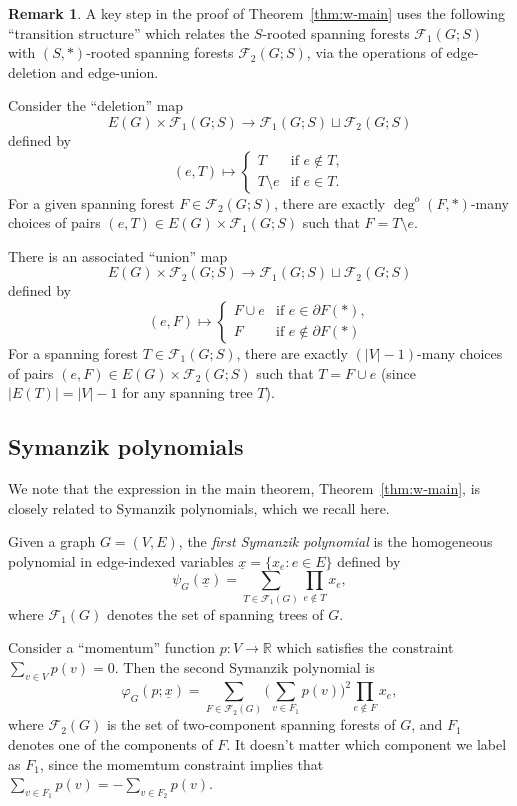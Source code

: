 \documentclass{amsart}
\theoremstyle{definition}
\newtheorem{rmk}[thm]{Remark}
\newcommand{\RR}{\mathbb{R}}
\newcommand{\trees}{\mathcal{F}_1}
\newcommand{\forests}{\mathcal{F}}
\newcommand{\degout}{\deg^o}
\begin{document}
\begin{rmk}
A key step in the proof of Theorem~\ref{thm:w-main} uses the following ``transition structure'' which relates the $S$-rooted spanning forests $\trees(G; S)$ with $(S,*)$-rooted spanning forests $\forests_2(G; S)$,
via the operations of edge-deletion and edge-union.

Consider the ``deletion'' map
\[
	E(G) \times \trees(G;S) \to \trees(G;S) \sqcup \forests_2(G;S)
\]
defined by
\[
	(e, T) \mapsto \begin{cases}
	T &\text{if } e\not\in T,\\
	T \setminus e &\text{if } e\in T.
	\end{cases}
\]
For a given spanning forest
$F \in \forests_2(G;S)$,
there are exactly $\degout(F, *)$-many choices of pairs $(e, T) \in E(G) \times \trees(G;S)$ such that
$F = T \setminus e$.

There is an associated ``union'' map 
\[
	E(G) \times \forests_2(G;S) \longrightarrow \trees(G;S) \sqcup \forests_2(G;S)
\]
defined by
\[
	(e, F) \mapsto \begin{cases}
		F \cup e &\text{if } e \in \partial F(*), \\
		F &\text{if } e \not\in \partial F(*)
	\end{cases}
\]
For a spanning forest $T \in \trees(G; S)$, 
there are exactly $(|V| - 1)$-many choices of pairs $(e, F) \in E(G) \times \forests_2(G; S)$ such that $T = F \cup e$
(since $|E(T)| = |V| - 1$ for any spanning tree $T$). 
\end{rmk}

\subsection{Symanzik polynomials}

We note that the expression in the main theorem, Theorem~\ref{thm:w-main}, is closely related to Symanzik polynomials, which we recall here.

Given a graph $G = (V, E)$, the {\em first Symanzik polynomial} is the homogeneous polynomial in edge-indexed variables $\underline{x} = \{x_e : e \in E\}$ defined by
\[
	\psi_G(\underline{x}) = \sum_{T \in \trees(G)} \prod_{e \not \in T} x_e ,
\]
where $\trees(G)$ denotes the set of spanning trees of $G$.

Consider a ``momentum'' function $p: V \to \RR$ which satisfies the constraint $\sum_{v \in V} p(v) = 0$.
Then the second Symanzik polynomial is
\[
	\varphi_G(p; \underline{x}) = \sum_{F \in \forests_2(G)} \Big(\sum_{v \in F_1} p(v) \Big)^2 \prod_{e \not\in F} x_e ,
\]
where $\forests_2(G)$ is the set of two-component spanning forests of $G$, and $F_1$ denotes one of the components of $F$.
It doesn't matter which component we label as $F_1$, since the momemtum constraint %
implies that
$\sum_{v \in F_1} p(v)  = - \sum_{v \in F_2} p(v)$.
\end{document}
